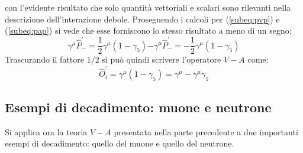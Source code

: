 \documentclass{subnucbo}
\begin{document}
con l'evidente risultato che solo quantità vettoriali e scalari sono rilevanti nella descrizione dell'interazione debole. Proseguendo i calcoli per (\ref{subeq:pvp}) e (\ref{subeq:pap}) si vede che esse forniscono lo stesso risultato a meno di un segno:
\begin{subequations}
        \begin{equation}
                \gamma ^ { \mu } \hat { P } _ { - } ^ { \prime } = \frac { 1 } { 2 } \gamma ^ { \mu } \left( 1 - \gamma _ { 5 } \right)
                \label{subeq:pvp_exp}
        \end{equation}
        \begin{equation}
                - \gamma ^ { \mu } \hat { P } _ { - } ^ { \prime } = - \frac { 1 } { 2 } \gamma ^ { \mu } \left( 1 - \gamma _ { 5 } \right)
                \label{subeq:pap_exp}
        \end{equation}
\end{subequations}
Trascurando il fattore $1/2$ si può quindi scrivere l'operatore $V-A$ come:
\begin{equation}
        \hat { O } _ { i } ^ { \prime } = \gamma ^ { \mu } \left( 1 - \gamma _ { 5 } \right) = \gamma ^ { \mu } - \gamma ^ { \mu } \gamma _ { 5 }
        \label{eq:va_operator}
\end{equation}


\subsection{Esempi di decadimento: muone e neutrone}
Si applica ora la teoria $V-A$ presentata nella parte precedente a due importanti esempi di decadimento: quello del muone e quello del neutrone.
\end{document}
